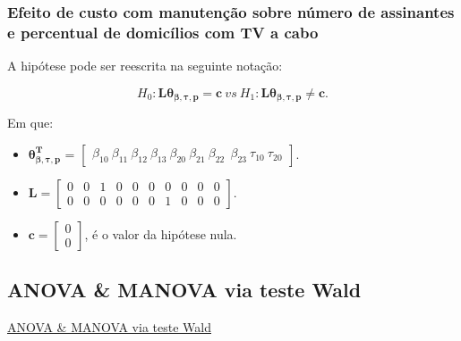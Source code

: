 \documentclass[10pt,
  aspectratio=169,
  serif,
  mathserif,
  professionalfont,
  compress,
  handout,
  ]{beamer}\usepackage[]{graphicx}\usepackage[]{color}
\begin{document}
\begin{frame}

\frametitle{Efeito de custo com manutenção sobre número de assinantes\\ e percentual de domicílios com TV a cabo}

A hipótese pode ser reescrita na seguinte notação:

$$H_0: \boldsymbol{L}\boldsymbol{\theta_{\beta,\tau,p}} = \boldsymbol{c} \ vs \ H_1: \boldsymbol{L}\boldsymbol{\theta_{\beta,\tau,p}} \neq \boldsymbol{c}.$$ 

Em que:

\begin{itemize}
  
 \item $\boldsymbol{\theta_{\beta,\tau,p}^T}$ = $\begin{bmatrix} \beta_{10} \  \beta_{11} \ \beta_{12} \ \beta_{13} \ \beta_{20} \ \beta_{21} \ \beta_{22} \ \ \beta_{23} \ \tau_{10} \ \tau_{20} \end{bmatrix}$.


\item $\boldsymbol{L} = \begin{bmatrix} 0 & 0 & 1 & 0 & 0 & 0 & 0 & 0 & 0 & 0 \\
0 & 0 & 0 & 0 & 0 & 0 & 1 & 0 & 0 & 0 \end{bmatrix}$.
 
\item $\boldsymbol{c} = \begin{bmatrix} 0 \\ 0 \end{bmatrix}$, é o valor da hipótese nula. 

\end{itemize}

\end{frame}


\subsection{ANOVA \& MANOVA via teste Wald}


\begin{frame}[c, allowframebreaks]

\begin{center}

  {\normalsize \href{https://lineu96.github.io/st/}{ANOVA \& MANOVA via teste Wald}}
  
\end{center}

\end{frame}
\end{document}
